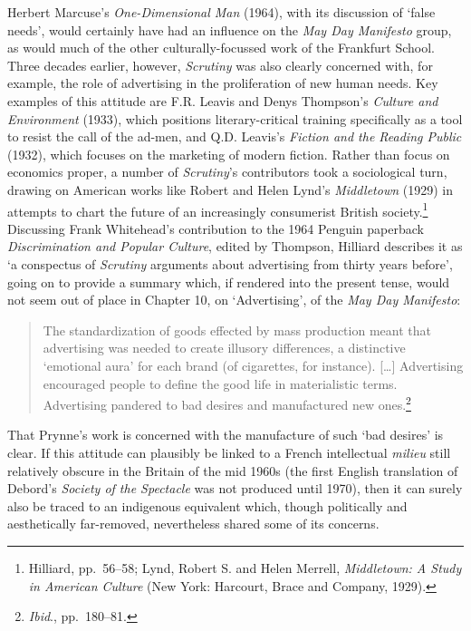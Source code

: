 \documentclass[]{article}
\begin{document}
Herbert Marcuse's \emph{One-Dimensional Man} (1964), with its discussion
of `false needs', would certainly have had an influence on the \emph{May
Day Manifesto} group, as would much of the other culturally-focussed
work of the Frankfurt School. Three decades earlier, however,
\emph{Scrutiny} was also clearly concerned with, for example, the role
of advertising in the proliferation of new human needs. Key examples of
this attitude are F.R. Leavis and Denys Thompson's \emph{Culture and
Environment} (1933), which positions literary-critical training
specifically as a tool to resist the call of the ad-men, and Q.D.
Leavis's \emph{Fiction and the Reading Public} (1932), which focuses on
the marketing of modern fiction. Rather than focus on economics proper,
a number of \emph{Scrutiny}'s contributors took a sociological turn,
drawing on American works like Robert and Helen Lynd's \emph{Middletown}
(1929) in attempts to chart the future of an increasingly consumerist
British society.\footnote{Hilliard, pp.~56--58; Lynd, Robert S. and
  Helen Merrell, \emph{Middletown: A Study in American Culture} (New
  York: Harcourt, Brace and Company, 1929).} Discussing Frank
Whitehead's contribution to the 1964 Penguin paperback
\emph{Discrimination and Popular Culture}, edited by Thompson, Hilliard
describes it as `a conspectus of \emph{Scrutiny} arguments about
advertising from thirty years before', going on to provide a summary
which, if rendered into the present tense, would not seem out of place
in Chapter 10, on `Advertising', of the \emph{May Day Manifesto}:

\begin{quote}
The standardization of goods effected by mass production meant that
advertising was needed to create illusory differences, a distinctive
`emotional aura' for each brand (of cigarettes, for instance).
{[}\ldots{}{]} Advertising encouraged people to define the good life in
materialistic terms. Advertising pandered to bad desires and
manufactured new ones.\footnote{\emph{Ibid}., pp.~180--81.}
\end{quote}

\noindent That Prynne's work is concerned with the manufacture of such
`bad desires' is clear. If this attitude can plausibly be linked to a
French intellectual \emph{milieu} still relatively obscure in the
Britain of the mid 1960s (the first English translation of Debord's
\emph{Society of the Spectacle} was not produced until 1970), then it
can surely also be traced to an indigenous equivalent which, though
politically and aesthetically far-removed, nevertheless shared some of
its concerns.
\end{document}
